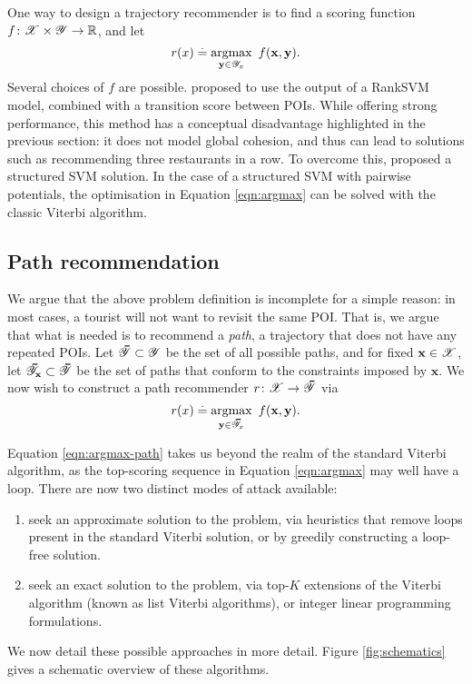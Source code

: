One way to design a trajectory recommender is to find a scoring function $f \colon \mathscr{X} \times \mathscr{Y} \to \mathbb{R}$, and let
\begin{equation}
	\label{eqn:argmax}
	r( x ) \stackrel{.}{=} \operatorname*{argmax}_{\mathbf{y} \in \mathscr{Y}_x}~f(\mathbf{x}, \mathbf{y}).
\end{equation}
Several choices of $f$ are possible.
\citet{cikm16paper} proposed to use the output of a RankSVM model, combined with a transition score between POIs.
While offering strong performance, this method has a conceptual disadvantage highlighted in the previous section:
it does not model global cohesion, and thus can lead to solutions such as recommending three restaurants in a row.
To overcome this, \citet{Chen:2017} proposed a structured SVM solution.
In the case of a structured SVM with pairwise potentials, the optimisation in Equation \ref{eqn:argmax} can be solved with the classic Viterbi algorithm.


%
\subsection{Path recommendation}

We argue that the above problem definition is incomplete for a simple reason:
in most cases, a tourist will not want to revisit the same POI.
That is, we argue that what is needed is to recommend a \emph{path}, \ie a trajectory that does not have any repeated POIs.
Let $\thickbar{\YCal} \subset \YCal$ be the set of all possible paths,
and for fixed $\mathbf{x} \in \mathscr{X}$, let $\thickbar{\YCal}_{\x} \subset \thickbar{\YCal}$ be the set of paths that conform to the constraints imposed by $\mathbf{x}$.
We now wish to construct a path recommender $r \colon \XCal \to \thickbar{\YCal}$ via
\begin{equation}
	\label{eqn:argmax-path}
	r( x ) \defEq \argmax_{\mathbf{y} \in \thickbar{\YCal}_x}~f(\mathbf{x}, \mathbf{y}).
\end{equation}

Equation \ref{eqn:argmax-path} takes us beyond the realm of the standard Viterbi algorithm, as the top-scoring sequence in Equation \ref{eqn:argmax} may well have a loop.
There are now two distinct modes of attack available:
\begin{enumerate}
	\item seek an approximate solution to the problem,
	via heuristics that remove loops present in the standard Viterbi solution,
	or by greedily constructing a loop-free solution.

	\item seek an exact solution to the problem,
	via top-$K$ extensions of the Viterbi algorithm (known as list Viterbi algorithms),
	or integer linear programming formulations.
\end{enumerate}
We now detail these possible approaches in more detail.
Figure \ref{fig:schematics} gives a schematic overview of these algorithms.

